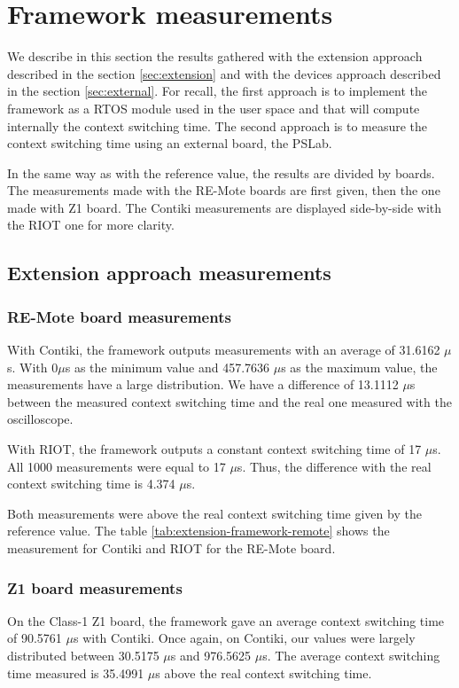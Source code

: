 \section{Framework measurements}

We describe in this section the results gathered with the extension approach described in the section \ref{sec:extension} and with the devices approach described in the section \ref{sec:external}.
For recall, the first approach is to implement the framework as a RTOS module used in the user space and that will compute internally the context switching time.
The second approach is to measure the context switching time using an external board, the PSLab.

In the same way as with the reference value, the results are divided by boards.
The measurements made with the RE-Mote boards are first given, then the one made with Z1 board.
The Contiki measurements are displayed side-by-side with the RIOT one for more clarity.

\subsection{Extension approach measurements}

\subsubsection{RE-Mote board measurements}
With Contiki, the framework outputs measurements with an average of 31.6162 $\mu$s.
With 0$\mu$s as the minimum value and 457.7636 $\mu$s as the maximum value, the measurements have a large distribution.
We have a difference of 13.1112 $\mu$s between the measured context switching time and the real one measured with the oscilloscope.

With RIOT, the framework outputs a constant context switching time of 17 $\mu$s.
All 1000 measurements were equal to 17 $\mu$s.
Thus, the difference with the real context switching time is 4.374 $\mu$s.

Both measurements were above the real context switching time given by the reference value.
The table \ref{tab:extension-framework-remote} shows the measurement for Contiki and RIOT for the RE-Mote board.



\subsubsection{Z1 board measurements}
On the Class-1 Z1 board, the framework gave an average context switching time of 90.5761 $\mu$s with Contiki.
Once again, on Contiki, our values were largely distributed between 30.5175 $\mu$s and 976.5625 $\mu$s.
The average context switching time measured is 35.4991 $\mu$s above the real context switching time.

